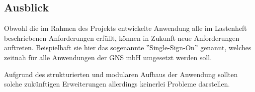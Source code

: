 \documentclass[12pt, xcolor=dvipsnames]{scrartcl}
\begin{document}
\subsection{Ausblick}

Obwohl die im Rahmen des Projekts entwickelte Anwendung alle im Lastenheft beschriebenen Anforderungen erfüllt, können in Zukunft neue Anforderungen auftreten.
Beispielhaft sie hier das sogenannte ''Single-Sign-On'' genannt, welches zeitnah für alle Anwendungen der GNS mbH umgesetzt werden soll.

Aufgrund des strukturierten und modularen Aufbaus der Anwendung sollten solche zukünftigen Erweiterungen allerdings keinerlei Probleme darstellen.

\newpage


\end{document}
